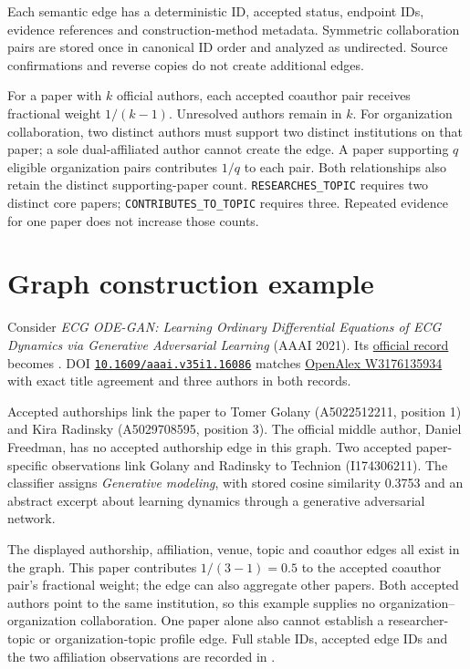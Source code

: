 Each semantic edge has a deterministic ID, accepted status, endpoint IDs,
evidence references and construction-method metadata. Symmetric collaboration pairs
are stored once in canonical ID order and analyzed as undirected. Source
confirmations and reverse copies do not create additional edges.

For a paper with $k$ official authors, each accepted coauthor pair receives
fractional weight $1/(k-1)$. Unresolved authors remain in $k$. For organization
collaboration, two distinct authors must support two distinct institutions on
that paper; a sole dual-affiliated author cannot create the edge. A paper
supporting $q$ eligible organization pairs contributes $1/q$ to each pair.
Both relationships also retain the distinct supporting-paper count.
\texttt{RESEARCHES\_TOPIC} requires two distinct core papers;
\texttt{CONTRIBUTES\_TO\_TOPIC} requires three. Repeated evidence for one paper
does not increase those counts.

\Needspace{18cm}
\section{Graph construction example}
Consider \emph{ECG ODE-GAN: Learning Ordinary Differential Equations of ECG
Dynamics via Generative Adversarial Learning} (AAAI 2021). Its
\href{https://ojs.aaai.org/index.php/AAAI/article/view/16086}{official record}
becomes . DOI
\href{https://doi.org/10.1609/aaai.v35i1.16086}{\texttt{10.1609/aaai.v35i1.16086}}
matches \href{https://openalex.org/W3176135934}{OpenAlex W3176135934} with exact
title agreement and three authors in both records.

Accepted authorships link the paper to Tomer Golany (A5022512211, position 1) and Kira Radinsky
(A5029708595, position 3). The official middle author, Daniel Freedman, has no
accepted authorship edge in this graph. Two accepted paper-specific observations
link Golany and Radinsky to Technion (I174306211). The classifier assigns
\emph{Generative modeling}, with stored cosine similarity 0.3753 and an abstract
excerpt about learning dynamics through a generative adversarial network.


\FloatBarrier

The displayed authorship, affiliation, venue, topic and coauthor edges all exist
in the graph. This paper contributes $1/(3-1)=0.5$ to the accepted coauthor
pair's fractional weight; the edge can also aggregate other papers. Both
accepted authors point to the same institution, so this example supplies no
organization--organization collaboration. One paper alone also cannot establish
a researcher-topic or organization-topic profile edge. Full stable IDs,
accepted edge IDs and the two affiliation observations are recorded in
.
